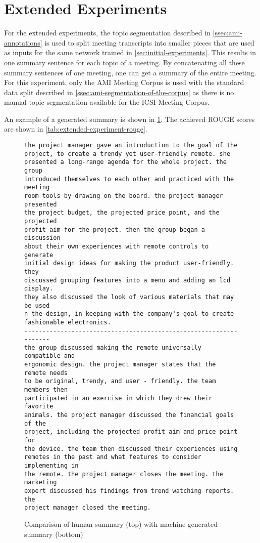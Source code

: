 
\section{Extended Experiments}

For the extended experiments, the topic segmentation described in \cref{ssec:ami-annotations} is used to split meeting transcripts into smaller pieces that are used as inputs for the same network trained in \cref{sec:initial-experiments}.
This results in one summary sentence for each topic of a meeting.
By concatenating all these summary sentences of one meeting, one can get a summary of the entire meeting.
For this experiment, only the AMI Meeting Corpus is used with the standard data split described in \cref{ssec:ami-segmentation-of-the-corpus} as there is no manual topic segmentation available for the ICSI Meeting Corpus. %

An example of a generated summary is shown in \cref{fig:extended-experiment-example}.
The achieved ROUGE scores are shown in \cref{tab:extended-experiment-rouge}.

\begin{figure}[h]
\begin{lstlisting}[numbers=none]
the project manager gave an introduction to the goal of the
project, to create a trendy yet user-friendly remote. she
presented a long-range agenda for the whole project. the group
introduced themselves to each other and practiced with the meeting
room tools by drawing on the board. the project manager presented
the project budget, the projected price point, and the projected
profit aim for the project. then the group began a discussion
about their own experiences with remote controls to generate
initial design ideas for making the product user-friendly. they
discussed grouping features into a menu and adding an lcd display.
they also discussed the look of various materials that may be used 
n the design, in keeping with the company's goal to create
fashionable electronics. 
------------------------------------------------------------------
the group discussed making the remote universally compatible and
ergonomic design. the project manager states that the remote needs
to be original, trendy, and user - friendly. the team members then
participated in an exercise in which they drew their favorite
animals. the project manager discussed the financial goals of the
project, including the projected profit aim and price point for
the device. the team then discussed their experiences using
remotes in the past and what features to consider implementing in
the remote. the project manager closes the meeting. the marketing
expert discussed his findings from trend watching reports. the
project manager closed the meeting. 
\end{lstlisting}
\caption[Comparison of human summary with machine-generated summary]{Comparison of human summary (top) with machine-generated summary (bottom)}
\label{fig:extended-experiment-example}
\end{figure}

